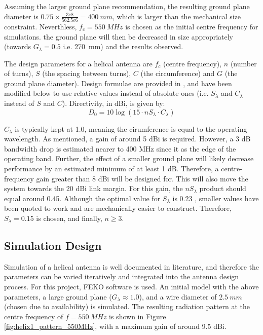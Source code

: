 Assuming the larger ground plane recommendation, the resulting ground plane diameter is $0.75 \times \frac{3e8}{562.5e6} = \SI{400}{mm}$, which is larger than the mechanical size constraint. Neverthless, $f_c = \SI{550}{MHz}$ is chosen as the initial centre frequency for simulations. the ground plane will then be decreased in size appropriately (towards $G_\lambda = 0.5$ i.e. \SI{270}{mm}) and the results observed.

The design parameters for a helical antenna are $f_c$ (centre frequency), $n$ (number of turns), $S$ (the spacing between turns), $C$ (the circumference) and $G$ (the ground plane diameter). Design formulae are provided in \cite{textbook-antennaTheoryAnalysisDesign}, and have been modified below to use relative values instead of absolute ones (i.e. $S_\lambda$ and $C_\lambda$ instead of $S$ and $C$). Directivity, in dBi, is given by:
$$
D_0 = 10 \log(15 \cdot n S_\lambda \cdot C_\lambda)
$$

$C_\lambda$ is typically kept at 1.0, meaning the cirumference is equal to the operating wavelength. As mentioned, a gain of around 5 dBi is required. However, a 3 dB bandwidth drop is estimated nearer to 400 MHz since it as the edge of the operating band. Further, the effect of a smaller ground plane will likely decrease performance by an estimated minimum of at least 1 dB. Therefore, a centre-frequency gain greater than 8 dBi will be designed for. This will also move the system towards the 20 dBi link margin. For this gain, the $n S_\lambda$ product should equal around 0.45. Although the optimal value for $S_\lambda$ is 0.23 \cite{textbook-antennaTheoryAnalysisDesign}, smaller values have been quoted to work \cite{site-helicalCalculator} and are mechanically easier to construct. Therefore, $S_\lambda = 0.15$ is chosen, and finally, $n \geq 3$.

\subsection{Simulation Design}
Simulation of a helical antenna is well documented in literature, and therefore the parameters can be varied iteratively and integrated into the antenna design process. For this project, FEKO software is used. An initial model with the above parameters, a large ground plane ($G_\lambda \approx 1.0$), and a wire diameter of $\SI{2.5}{mm}$ (chosen due to availability) is simulated. The resulting radiation pattern at the centre frequency of $f = \SI{550}{MHz}$ is shown in Figure \ref{fig:helix1_pattern_550MHz}, with a maximum gain of around 9.5 dBi.

